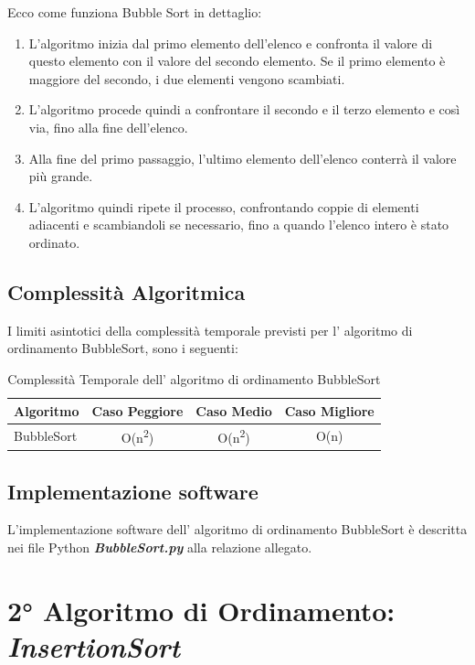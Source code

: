 \documentclass{article}
\begin{document}
			Ecco come funziona Bubble Sort in dettaglio:
			\begin{enumerate}
				\item L'algoritmo inizia dal primo elemento dell'elenco e confronta il valore di questo elemento con il valore del secondo elemento. Se il primo elemento è maggiore del secondo, i due elementi vengono scambiati.
				
				\item  L'algoritmo procede quindi a confrontare il secondo e il terzo elemento e così via, fino alla fine dell'elenco.
				
				\item Alla fine del primo passaggio, l'ultimo elemento dell'elenco conterrà il valore più grande.
				
				\item L'algoritmo quindi ripete il processo, confrontando coppie di elementi adiacenti e scambiandoli se necessario, fino a quando l'elenco intero è stato ordinato.
			\end{enumerate}
		
		\subsection{Complessità Algoritmica}
			I limiti asintotici della complessità temporale previsti per l' algoritmo di ordinamento BubbleSort, sono i seguenti:

			\begin{table}[ht]
				\centering
				\begin{tabular}{|l|ccc|}
					\rowcolor[HTML]{C0C0C0}
					\hline
					Algoritmo    		& Caso Peggiore & Caso Medio & Caso Migliore \\
					\hline
					BubbleSort       	& O(n\textsuperscript{2})          & O(n\textsuperscript{2})    & O(n)          \\
					\hline
				\end{tabular}
				\caption{Complessità Temporale dell' algoritmo di ordinamento BubbleSort}
			\end{table}
		
		\subsection{Implementazione software}
			L'implementazione software dell' algoritmo di ordinamento BubbleSort è descritta nei file Python \textbf{\textit{BubbleSort.py}} alla relazione allegato.

	
	\newpage
	\section{2° Algoritmo di Ordinamento: \textit{InsertionSort}}
\end{document}
